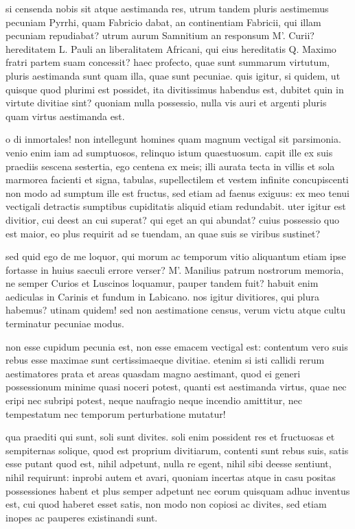  si censenda nobis sit atque aestimanda res, utrum tandem pluris aestimemus pecuniam Pyrrhi, quam Fabricio dabat, an continentiam Fabricii, qui illam pecuniam repudiabat? utrum aurum Samnitium an responsum M'. Curii? hereditatem L. Pauli an liberalitatem Africani, qui eius hereditatis Q. Maximo fratri partem suam concessit? haec profecto, quae sunt summarum virtutum, pluris aestimanda sunt quam illa, quae sunt pecuniae. quis igitur, si quidem, ut quisque quod plurimi est possidet, ita divitissimus habendus est, dubitet quin in virtute divitiae sint? quoniam nulla possessio, nulla vis auri et argenti pluris quam virtus aestimanda est.

 o di inmortales! non intellegunt homines quam magnum vectigal sit parsimonia. venio enim iam ad sumptuosos, relinquo istum quaestuosum. capit ille ex suis praediis sescena sestertia, ego centena ex meis; illi aurata tecta in villis et sola marmorea facienti et signa, tabulas, supellectilem et vestem infinite concupiscenti non modo ad sumptum ille est fructus, sed etiam ad faenus exiguus: ex meo tenui vectigali detractis sumptibus cupiditatis aliquid etiam redundabit. uter igitur est divitior, cui deest an cui superat? qui eget an qui abundat? cuius possessio quo est maior, eo plus requirit ad se tuendam, an quae suis se viribus sustinet?

 sed quid ego de me loquor, qui morum ac temporum vitio aliquantum etiam ipse fortasse in huius saeculi errore verser? M'. Manilius patrum nostrorum memoria, ne semper Curios et Luscinos loquamur, pauper tandem fuit? habuit enim aediculas in Carinis et fundum in Labicano. nos igitur divitiores, qui plura habemus? utinam quidem! sed non aestimatione census, verum victu atque cultu terminatur pecuniae modus.

 non esse cupidum pecunia est, non esse emacem vectigal est: contentum vero suis rebus esse maximae sunt certissimaeque divitiae. etenim si isti callidi rerum aestimatores prata et areas quasdam magno aestimant, quod ei generi possessionum minime quasi noceri potest, quanti est aestimanda virtus, quae nec eripi nec subripi potest, neque naufragio neque incendio amittitur, nec tempestatum nec temporum perturbatione mutatur!

 qua praediti qui sunt, soli sunt divites. soli enim possident res et fructuosas et sempiternas solique, quod est proprium divitiarum, contenti sunt rebus suis, satis esse putant quod est, nihil adpetunt, nulla re egent, nihil sibi deesse sentiunt, nihil requirunt: inprobi autem et avari, quoniam incertas atque in casu positas possessiones habent et plus semper adpetunt nec eorum quisquam adhuc inventus est, cui quod haberet esset satis, non modo non copiosi ac divites, sed etiam inopes ac pauperes existinandi sunt.
